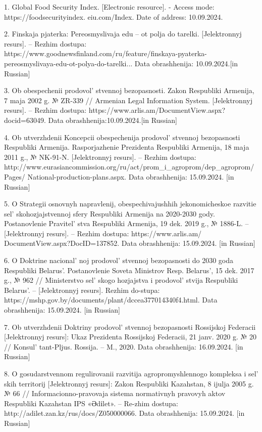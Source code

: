 {1. Global Food Security Index. {[}Electronic resource{]}. - Access mode:
https://foodsecurityindex. eiu.com/Index. Date of address: 10.09.2024.

2. Finskaja pjaterka: Pereosmyslivaja edu -- ot polja do tarelki.
{[}Jelektronnyj resurs{]}. -- Rezhim dostupa:
https://www.goodnewsfinland.com/ru/feature/finskaya-pyaterka-pereosmyslivaya-edu-ot-polya-do-tarelki...
Data obrashhenija: 10.09.2024.{[}in Russian{]}

3. Ob obespechenii prodovol' stvennoj bezopasnosti. Zakon
Respubliki Armenija, 7 maja 2002 g. № ZR-339 // Armenian Legal
Information System. {[}Jelektronnyj resurs{]}. -- Rezhim dostupa:
https://www.arlis.am/DocumentView.aspx?docid=63049. Data
obrashhenija:10.09.2024.{[}in Russian{]}

4. Ob utverzhdenii Koncepcii obespechenija
prodovol' stvennoj bezopasnosti Respubliki Armenija.
Rasporjazhenie Prezidenta Respubliki Armenija, 18 maja 2011 g., №
NK-91-N. {[}Jelektronnyj resurs{]}. -- Rezhim dostupa:
http://www.eurasiancommission.org/ru/act/prom\_i\_agroprom/dep\_agroprom/Pages/
National-production-plans.aspx. Data obrashhenija: 15.09.2024. {[}in
Russian{]}

5. O Strategii osnovnyh napravlenij, obespechivajushhih jekonomicheskoe
razvitie sel' skohozjajstvennoj sfery Respubliki Armenija
na 2020-2030 gody. Postanovlenie Pravitel' stva
Respubliki Armenija, 19 dek. 2019 g., № 1886-L. -- {[}Jelektronnyj
resurs{]}. -- Rezhim dostupa: https://www.arlis.am/
DocumentView.aspx?DocID=137852. Data obrashhenija: 15.09.2024. {[}in
Russian{]}

6. O Doktrine nacional' noj
prodovol' stvennoj bezopasnosti do 2030 goda Respubliki
Belarus'. Postanovlenie Soveta Ministrov Resp.
Belarus', 15 dek. 2017 g., № 962 // Ministerstvo
sel' skogo hozjajstva i prodovol' stvija
Respubliki Belarus'. -- {[}Jelektronnyj resurs{]}. Rezhim
do-stupa: https://mshp.gov.by/documents/plant/dccea377014340f4.html.
Data obrashhenija: 15.09.2024. {[}in Russian{]}

7. Ob utverzhdenii Doktriny prodovol' stvennoj
bezopasnosti Rossijskoj Federacii {[}Jelektronnyj resurs{]}: Ukaz
Prezidenta Rossijskoj Federacii, 21 janv. 2020 g. № 20 //
Konsul' tant-Pljus. Rossija. -- M., 2020. Data
obrashhenija: 16.09.2024. {[}in Russian{]}

8. O gosudarstvennom regulirovanii razvitija agropromyshlennogo
kompleksa i sel' skih territorij {[}Jelektronnyj
resurs{]}: Zakon Respubliki Kazahstan, 8 ijulja 2005 g. № 66 //
Informacionno-pravovaja sistema normativnyh pravovyh aktov Respubliki
Kazahstan IPS «Әdіlet». -- Re-zhim dostupa:
http://adilet.zan.kz/rus/docs/Z050000066. Data obrashhenija: 15.09.2024.
{[}in Russian{]}

}
